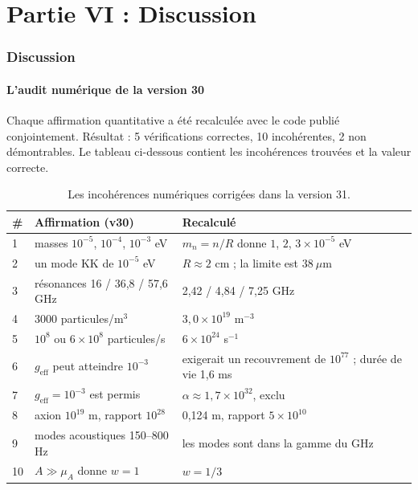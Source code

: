 \documentclass[11pt,a4paper]{article}
\begin{document}
\newpage
\part*{Partie VI : Discussion}

\section{Discussion}
\subsection{L'audit numérique de la version 30}
Chaque affirmation quantitative a été recalculée avec le code publié conjointement. Résultat : 5 vérifications correctes, 10 incohérentes, 2 non démontrables. Le tableau ci-dessous contient les incohérences trouvées et la valeur correcte.

\begin{table}[H]
\centering
\small
\begin{tabular}{@{}p{0.5cm}p{6.2cm}p{5.2cm}@{}}
\toprule
\# & \textbf{Affirmation (v30)} & \textbf{Recalculé} \\ \midrule
1 & masses $10^{-5}$, $10^{-4}$, $10^{-3}$ eV & $m_n = n/R$ donne $1$, $2$, $3 \times 10^{-5}$ eV \\
2 & un mode KK de $10^{-5}$ eV & $R \approx 2$ cm ; la limite est $38\ \mu$m \\
3 & résonances 16 / 36,8 / 57,6 GHz & 2,42 / 4,84 / 7,25 GHz \\
4 & 3000 particules/m$^3$ & $3,0\times10^{19}$ m$^{-3}$ \\
5 & $10^8$ ou $6\times10^8$ particules/s & $6\times10^{24}$ s$^{-1}$ \\
6 & $g_{\text{eff}}$ peut atteindre $10^{-3}$ & exigerait un recouvrement de $10^{77}$ ; durée de vie 1,6 ms \\
7 & $g_{\text{eff}} = 10^{-3}$ est permis & $\alpha \approx 1,7\times10^{32}$, exclu \\
8 & axion $10^{19}$ m, rapport $10^{28}$ & 0,124 m, rapport $5\times10^{10}$ \\
9 & modes acoustiques 150--800 Hz & les modes sont dans la gamme du GHz \\
10 & $A \gg \mu_A$ donne $w = 1$ & $w = 1/3$ \\ \bottomrule
\end{tabular}
\caption{Les incohérences numériques corrigées dans la version 31.}
\label{tab:audit}
\end{table}
\end{document}
